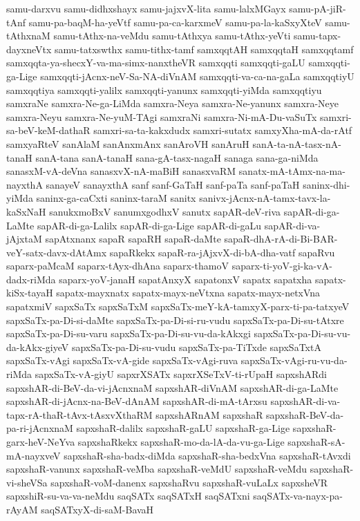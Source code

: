 {samu-darxvu
samu-didhxshayx
samu-jajxvX-lita
samu-lalxMGayx
samu-pA-jiR-tAnf
samu-pa-baqM-ha-yeVtf
samu-pa-ca-karxmeV
samu-pa-la-kaSxyXteV
samu-tAthxnaM
samu-tAthx-na-veMdu
samu-tAthxya
samu-tAthx-yeVti
samu-tapx-dayxneVtx
samu-tatxswthx
samu-tithx-tamf
samxqqtAH
samxqqtaH
samxqqtamf
samxqqta-ya-shecxY-va-ma-simx-nanxtheVR
samxqqti
samxqqti-gaLU
samxqqti-ga-Lige
samxqqti-jAcnx-neV-Sa-NA-diVnAM
samxqqti-va-ca-na-gaLa
samxqqtiyU
samxqqtiya
samxqqti-yalilx
samxqqti-yanunx
samxqqti-yiMda
samxqqtiyu
samxraNe
samxra-Ne-ga-LiMda
samxra-Neya
samxra-Ne-yanunx
samxra-Neye
samxra-Neyu
samxra-Ne-yuM-TAgi
samxraNi
samxra-Ni-mA-Du-vaSuTx
samxri-sa-beV-keM-dathaR
samxri-sa-ta-kakxdudx
samxri-sutatx
samxyXha-mA-da-rAtf
samxyaRteV
sanAlaM
sanAnxmAnx
sanAroVH
sanAruH
sanA-ta-nA-tasx-nA-tanaH
sanA-tana
sanA-tanaH
sana-gA-tasx-nagaH
sanaga
sana-ga-niMda
sanasxM-vA-deVna
sanasxvX-nA-maBiH
sanasxvaRM
sanatx-mA-tAmx-na-ma-nayxthA
sanayeV
sanayxthA
sanf
sanf-GaTaH
sanf-paTa
sanf-paTaH
saninx-dhi-yiMda
saninx-ga-caCxti
saninx-taraM
sanitx
sanivx-jAcnx-nA-tamx-tavx-la-kaSxNaH
sanukxmoBxV
sanumxgodhxV
sanutx
sapAR-deV-riva
sapAR-di-ga-LaMte
sapAR-di-ga-Lalilx
sapAR-di-ga-Lige
sapAR-di-gaLu
sapAR-di-va-jAjxtaM
sapAtxnanx
sapaR
sapaRH
sapaR-daMte
sapaR-dhA-rA-di-Bi-BAR-veY-satx-davx-dAtAmx
sapaRkekx
sapaR-ra-jAjxvX-di-bA-dha-vatf
sapaRvu
saparx-paMcaM
saparx-tAyx-dhAna
saparx-thamoV
saparx-ti-yoV-gi-ka-vA-dadx-riMda
saparx-yoV-janaH
sapatAnxyX
sapatonxV
sapatx
sapatxha
sapatx-kiSx-tayaH
sapatx-mayxnatx
sapatx-mayx-neVtxna
sapatx-mayx-netxVna
sapatxmiV
sapxSaTx
sapxSaTxM
sapxSaTx-meY-kA-tamxyX-parx-ti-pa-tatxyeV
sapxSaTx-pa-Di-si-daMte
sapxSaTx-pa-Di-si-ru-vudu
sapxSaTx-pa-Di-su-tAtxre
sapxSaTx-pa-Di-su-varu
sapxSaTx-pa-Di-su-vu-da-kAkxgi
sapxSaTx-pa-Di-su-vu-da-kAkx-giyeV
sapxSaTx-pa-Di-su-vudu
sapxSaTx-pa-TiTxde
sapxSaTxtA
sapxSaTx-vAgi
sapxSaTx-vA-gide
sapxSaTx-vAgi-ruva
sapxSaTx-vAgi-ru-vu-da-riMda
sapxSaTx-vA-giyU
sapxrXSATx
sapxrXSeTxV-ti-rUpaH
sapxshARdi
sapxshAR-di-BeV-da-vi-jAcnxnaM
sapxshAR-diVnAM
sapxshAR-di-ga-LaMte
sapxshAR-di-jAcnx-na-BeV-dAnAM
sapxshAR-di-mA-tArxsu
sapxshAR-di-va-tapx-rA-thaR-tAvx-tAsxvXthaRM
sapxshARnAM
sapxshaR
sapxshaR-BeV-da-pa-ri-jAcnxnaM
sapxshaR-dalilx
sapxshaR-gaLU
sapxshaR-ga-Lige
sapxshaR-garx-heV-NeYva
sapxshaRkekx
sapxshaR-mo-da-lA-da-vu-ga-Lige
sapxshaR-sA-mA-nayxveV
sapxshaR-sha-badx-diMda
sapxshaR-sha-bedxVna
sapxshaR-tAvxdi
sapxshaR-vanunx
sapxshaR-veMba
sapxshaR-veMdU
sapxshaR-veMdu
sapxshaR-vi-sheVSa
sapxshaR-voM-danenx
sapxshaRvu
sapxshaR-vuLaLx
sapxsheVR
sapxshiR-su-va-va-neMdu
saqSATx
saqSATxH
saqSATxni
saqSATx-va-nayx-pa-rAyAM
saqSATxyX-di-saM-BavaH
}
